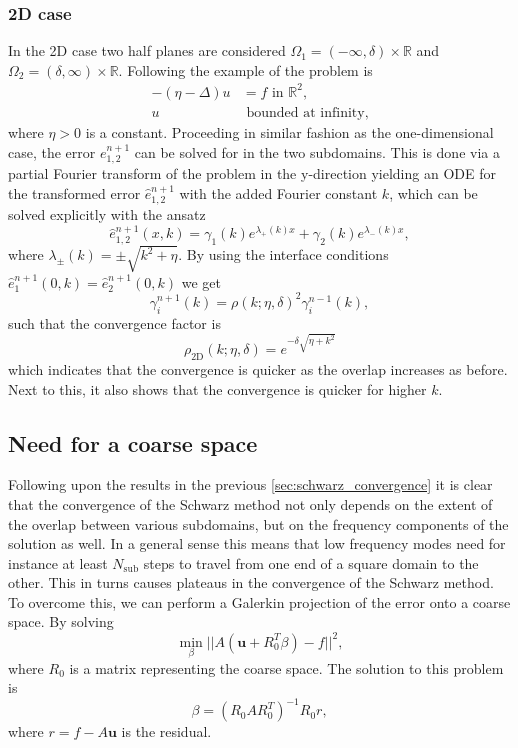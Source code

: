 \subsubsection{2D case}
In the 2D case two half planes are considered $\Omega_1 = (-\infty, \delta)\times \mathbb{R}$ and $\Omega_2 = (\delta, \infty)\times \mathbb{R}$. Following the example of \cite[Section 1.5.2]{schwarz_methods_Dolean_2015} the problem is
\begin{align*}
    -(\eta - \Delta) u & = f \text{ in } \mathbb{R}^2, \\
    u                  & \text{ bounded at infinity},
\end{align*}
where $\eta > 0$ is a constant. Proceeding in similar fashion as the one-dimensional case, the error $e^{n+1}_{1,2}$ can be solved for in the two subdomains. This is done via a partial Fourier transform of the problem in the y-direction yielding an ODE for the transformed error $\hat{e}^{n+1}_{1,2}$ with the added Fourier constant $k$, which can be solved explicitly with the ansatz
\[
    \hat{e}^{n+1}_{1,2}(x, k) = \gamma_1(k) e^{\lambda_{+}(k) x} + \gamma_2(k) e^{\lambda_{-}(k) x},
\]
where $\lambda_{\pm}(k) = \pm \sqrt{k^2 + \eta}$. By using the interface conditions $\hat{e}^{n+1}_{1}(0, k) = \hat{e}^{n+1}_{2}(0, k)$ we get
\[
    \gamma_{i}^{n+1}(k) = \rho(k;\eta,\delta)^2 \gamma_{i}^{n-1}(k),
\]
such that the convergence factor is \cite[Equation 1.36]{schwarz_methods_Dolean_2015}
\begin{equation}
    \rho_{\text{2D}}(k;\eta,\delta) = e^{-\delta\sqrt{\eta + k^2}}
    \label{eq:2D_Schwarz_convergence}
\end{equation}
which indicates that the convergence is quicker as the overlap increases as before. Next to this, it also shows that the convergence is quicker for higher $k$.

\subsection{Need for a coarse space}
Following upon the results in the previous \cref{sec:schwarz_convergence} it is clear that the convergence of the Schwarz method not only depends on the extent of the overlap between various subdomains, but on the frequency components of the solution as well. In a general sense this means that low frequency modes need for instance at least $N_{\text{sub}}$ steps to travel from one end of a square domain to the other. This in turns causes plateaus in the convergence of the Schwarz method. To overcome this, we can perform a Galerkin projection of the error onto a coarse space. By solving
\[
    \min_{\beta} ||A(\mathbf{u} + R_0^T\beta) - f||^2,
\]
where $R_0$ is a matrix representing the coarse space. The solution to this problem is
\[
    \beta = (R_0 A R_0^T)^{-1} R_0 r,
\]
where $r = f - A \mathbf{u}$ is the residual.

